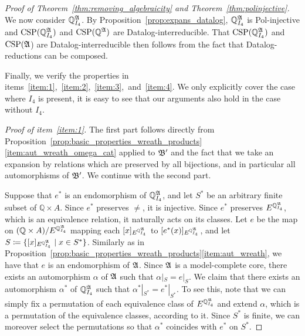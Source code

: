 \begin{proof}[Proof of Theorem~\ref{thm:removing_algebraicity} and Theorem~\ref{thm:polinjective}]
We now consider $\mathbb{Q}^{\mathfrak{A}}_{I_4}$. 
%
By Proposition~\ref{prop:expans_datalog}, $\mathbb{Q}^{\mathfrak{A}}_{I_4}$ is Pol-injective and $\mathrm{CSP}(\mathbb{Q}^{\mathfrak{A}}_{I_4})$ and $\mathrm{CSP}(\mathbb{Q}^{\mathfrak{A}})$ are Datalog-interreducible.
%
That $\mathrm{CSP}(\mathbb{Q}^{\mathfrak{A}}_{I_4})$ and $\mathrm{CSP}(\mathfrak{A}$) are Datalog-interreducible then follows from the fact that Datalog-reductions can be composed.
 
  
 
 

Finally, we verify the properties in items~\ref{item:1},~\ref{item:2},~\ref{item:3},~and~\ref{item:4}.
%
We only explicitly cover the case where $I_4$ is present, it is easy to see that our arguments also hold in the case without $I_4$.

\textit{Proof of item~\ref{item:1}.} The first part follows directly from Proposition~\ref{prop:basic_properties_wreath_products}\eqref{item:aut_wreath_omega_cat} applied to $\mathfrak{B}'$ and the fact that we take an expansion by relations which are preserved by all bijections, and in particular all automorphisms of $\mathfrak{B}'$. 
We continue with the second part. 

Suppose that $e^{\ast}$ is an endomorphism of $\mathbb{Q}^{\mathfrak{A}}_{I_4}$, and let $S^{\ast}$ be an arbitrary finite subset of $\mathbb{Q}\times A$.
%
Since $e^{\ast}$ preserves $\neq$, it is injective. Since $e^{\ast}$ preserves $E^{\smash{\mathbb{Q}^{\mathfrak{A}}_{I_4}}}$, which is an equivalence relation, it naturally acts on its classes.
%
Let $e$ be the map on $(\mathbb{Q}\times A)/E^{\smash{\mathbb{Q}^{\mathfrak{A}}_{I_4}}}$ mapping each $[x]_{\smash{E^{\smash{\mathbb{Q}^{\mathfrak{A}}_{I_4}}}}}$ to $[e^{\ast}(x)]_{\smash{E^{\smash{\mathbb{Q}^{\mathfrak{A}}_{I_4}}}}}$, and let $S\mathrel{\mathop:}\mathrel{\mkern-1.2mu}= \{[x]_{E^{\smash{\mathbb{Q}^{\mathfrak{A}}_{I_4}}}} \mid x\in S^{\ast}\}$.
%  
Similarly as in Proposition~\ref{prop:basic_properties_wreath_products}\eqref{item:aut_wreath}, we have that $e$ is an endomorphism of $\mathfrak{A}$. 
%
Since $\mathfrak{A}$ is a model-complete core, there exists an automorphism $\alpha$ of $\mathfrak{A}$ such that $\alpha|_S=e|_S$.
% 
We claim that there exists an automorphism ${\alpha}^{\ast}$ of $\mathbb{Q}^{\mathfrak{A}}_{I_4}$ such that ${\alpha}^{\ast}|_{S^{\ast}}=e^{\ast}|_{S^{\ast}}$.
%
To see this, note that we can simply fix a  permutation  of each equivalence class of $E^{\smash{\mathbb{Q}^{\mathfrak{A}}_{I_4}}}$ and extend $\alpha$, which is a permutation of the equivalence classes, according to it.
%
Since $S^{\ast}$ is finite, we can moreover select the permutations so that ${\alpha}^{\ast}$ coincides with $e^{\ast}$ on $S^{\ast}$.


\end{proof}
